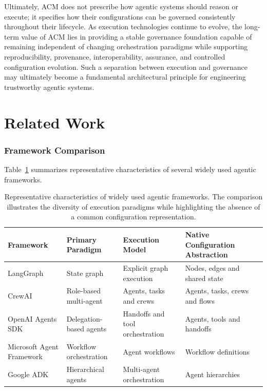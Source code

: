 \documentclass[10pt]{article}
\begin{document}
Ultimately, ACM does not prescribe how agentic systems should reason or execute; it specifies how their configurations can be governed consistently throughout their lifecycle. As execution technologies continue to evolve, the long-term value of ACM lies in providing a stable governance foundation capable of remaining independent of changing orchestration paradigms while supporting reproducibility, provenance, interoperability, assurance, and controlled configuration evolution. Such a separation between execution and governance may ultimately become a fundamental architectural principle for engineering trustworthy agentic systems.

\appendices

\section{Related Work}
\label{appendix:related_work}
\subsubsection{Framework Comparison}
Table~\ref{tab:framework_comparison} summarizes representative characteristics of several widely used agentic frameworks.
\begin{table}[t]
	\centering
	\caption{Representative characteristics of widely used agentic frameworks. The comparison illustrates the diversity of execution paradigms while highlighting the absence of a common configuration representation.}
	\label{tab:framework_comparison}
	
	\renewcommand{\arraystretch}{1.15}
	
	\begin{tabular}{p{3.2cm}p{3.1cm}p{3.4cm}p{3.4cm}c}
		\toprule
		\textbf{Framework}
		&
		\textbf{Primary Paradigm}
		&
		\textbf{Execution Model}
		&
		\textbf{Native Configuration Abstraction}
		\\
		\midrule
		
		LangGraph
		&
		State graph
		&
		Explicit graph execution
		&
		Nodes, edges and shared state
		\\
		
		CrewAI
		&
		Role-based multi-agent
		&
		Agents, tasks and crews
		&
		Agents, tasks, crews and flows
		\\
		
		OpenAI Agents SDK
		&
		Delegation-based agents
		&
		Handoffs and tool orchestration
		&
		Agents, tools and handoffs
		\\
		
		Microsoft Agent Framework
		&
		Workflow orchestration
		&
		Agent workflows
		&
		Workflow definitions
		\\
		
		Google ADK
		&
		Hierarchical agents
		&
		Multi-agent orchestration
		&
		Agent hierarchies
		\\
		
		\bottomrule
	\end{tabular}
	
\end{table}
\end{document}
